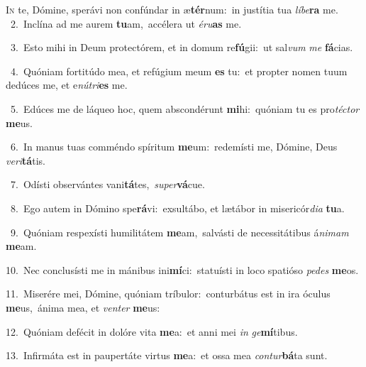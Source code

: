 \lettrine{\initial\textcolor{\initialcolor}{I}}{n} te, Dómine, sperávi non confúndar in æ\-\textbf{tér}\-num:~\star in justítia tua \textit{lí}\-\textit{be}\textbf{ra} me.\\
{\numbfont\textcolor{\numbcolor}{~2.}}~Inclína ad me aurem \textbf{tu}\-am,~\star accélera ut \textit{é}\-\textit{ru}\textbf{as} me.\par
{\numbfont\textcolor{\numbcolor}{~3.}}~Esto mihi in Deum protectórem, et in domum re\-\textbf{fú}\-gii:~\star ut sal\textit{vum} \textit{me} \textbf{fá}\-cias.\par
{\numbfont\textcolor{\numbcolor}{~4.}}~Quóniam fortitúdo mea, et refúgium meum \textbf{es} tu:~\star et propter nomen tuum dedúces me, et e\-\textit{nú}\-\textit{tri}\textbf{es} me.\par
{\numbfont\textcolor{\numbcolor}{~5.}}~Edúces me de láqueo hoc, quem abscondérunt \textbf{mi}\-hi:~\star quóniam tu es pro\-\textit{téc}\-\textit{tor} \textbf{me}\-us.\par
{\numbfont\textcolor{\numbcolor}{~6.}}~In manus tuas comméndo spíritum \textbf{me}\-um:~\star redemísti me, Dómine, Deus \textit{ve}\-\textit{ri}\textbf{tá}tis.\par
{\numbfont\textcolor{\numbcolor}{~7.}}~Odísti observántes vani\-\textbf{tá}\-tes,~\star \textit{su}\-\textit{per}\textbf{vá}cue.\par
{\numbfont\textcolor{\numbcolor}{~8.}}~Ego autem in Dómino spe\-\textbf{rá}\-vi:~\star exsultábo, et lætábor in misericór\-\textit{di}\-\textit{a} \textbf{tu}\-a.\par
{\numbfont\textcolor{\numbcolor}{~9.}}~Quóniam respexísti humilitátem \textbf{me}\-am,~\star salvásti de necessitátibus á\-\textit{ni}\-\textit{mam} \textbf{me}\-am.\par
{\numbfont\textcolor{\numbcolor}{10.}}~Nec conclusísti me in mánibus ini\-\textbf{mí}\-ci:~\star statuísti in loco spatióso \textit{pe}\-\textit{des} \textbf{me}\-os.\par
{\numbfont\textcolor{\numbcolor}{11.}}~Miserére mei, Dómine, quóniam tríbulor:~\dagger conturbátus est in ira óculus \textbf{me}\-us,~\star ánima mea, et \textit{ven}\-\textit{ter} \textbf{me}\-us:\par
{\numbfont\textcolor{\numbcolor}{12.}}~Quóniam defécit in dolóre vita \textbf{me}\-a:~\star et anni mei \textit{in} \textit{ge}\-\textbf{mí}tibus.\par
{\numbfont\textcolor{\numbcolor}{13.}}~Infirmáta est in paupertáte virtus \textbf{me}\-a:~\star et ossa mea \textit{con}\-\textit{tur}\textbf{bá}ta sunt.\par
